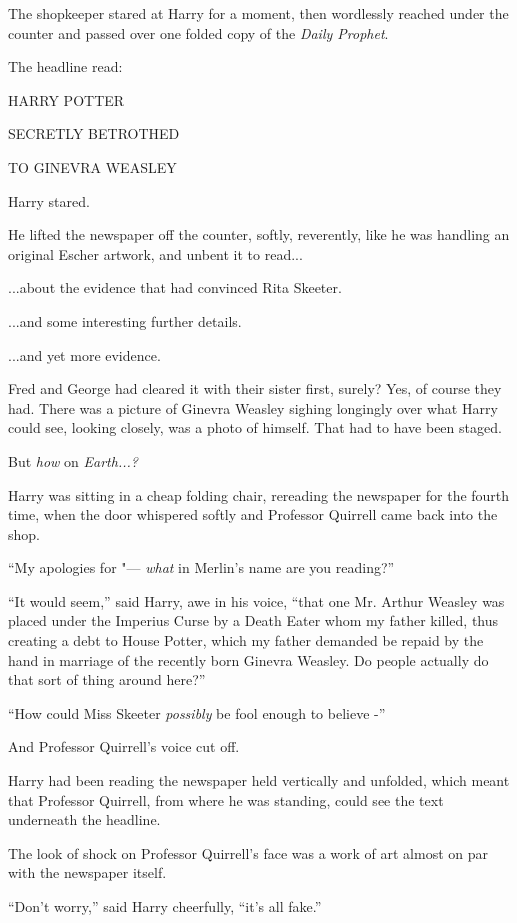 The shopkeeper stared at Harry for a moment, then wordlessly reached
under the counter and passed over one folded copy of the \emph{Daily
Prophet}.

The headline read:

HARRY POTTER

SECRETLY BETROTHED

TO GINEVRA WEASLEY

Harry stared.

He lifted the newspaper off the counter, softly, reverently, like he was
handling an original Escher artwork, and unbent it to read...

...about the evidence that had convinced Rita Skeeter.

...and some interesting further details.

...and yet more evidence.

Fred and George had cleared it with their sister first, surely? Yes, of
course they had. There was a picture of Ginevra Weasley sighing
longingly over what Harry could see, looking closely, was a photo of
himself. That had to have been staged.

But \emph{how} on \emph{Earth...?}

Harry was sitting in a cheap folding chair, rereading the newspaper for
the fourth time, when the door whispered softly and Professor Quirrell
came back into the shop.

``My apologies for "--- \emph{what} in Merlin's name are you reading?''

``It would seem,'' said Harry, awe in his voice, ``that one Mr. Arthur
Weasley was placed under the Imperius Curse by a Death Eater whom my
father killed, thus creating a debt to House Potter, which my father
demanded be repaid by the hand in marriage of the recently born Ginevra
Weasley. Do people actually do that sort of thing around here?''

``How could Miss Skeeter \emph{possibly} be fool enough to believe -''

And Professor Quirrell's voice cut off.

Harry had been reading the newspaper held vertically and unfolded, which
meant that Professor Quirrell, from where he was standing, could see the
text underneath the headline.

The look of shock on Professor Quirrell's face was a work of art almost
on par with the newspaper itself.

``Don't worry,'' said Harry cheerfully, ``it's all fake.''

